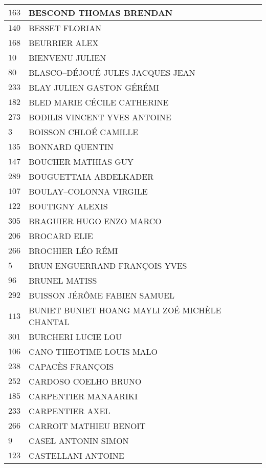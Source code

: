 \begin{xltabular}{\linewidth}{|l|X|}
    \hline
    $163$ & BESCOND THOMAS BRENDAN \\
    \hline
    $140$ & BESSET FLORIAN \\
    \hline
    $168$ & BEURRIER ALEX \\
    \hline
    $10$ & BIENVENU JULIEN \\
    \hline
    $80$ & BLASCO--DÉJOUÉ JULES JACQUES JEAN \\
    \hline
    $233$ & BLAY JULIEN GASTON GÉRÉMI \\
    \hline
    $182$ & BLED MARIE CÉCILE CATHERINE \\
    \hline
    $273$ & BODILIS VINCENT YVES ANTOINE \\
    \hline
    $3$ & BOISSON CHLOÉ CAMILLE \\
    \hline
    $135$ & BONNARD QUENTIN \\
    \hline
    $147$ & BOUCHER MATHIAS GUY \\
    \hline
    $289$ & BOUGUETTAIA ABDELKADER \\
    \hline
    $107$ & BOULAY--COLONNA VIRGILE \\
    \hline
    $122$ & BOUTIGNY ALEXIS \\
    \hline
    $305$ & BRAGUIER HUGO ENZO MARCO \\
    \hline
    $206$ & BROCARD ELIE \\
    \hline
    $266$ & BROCHIER LÉO RÉMI \\
    \hline
    $5$ & BRUN ENGUERRAND FRANÇOIS YVES \\
    \hline
    $96$ & BRUNEL MATISS \\
    \hline
    $292$ & BUISSON JÉRÔME FABIEN SAMUEL \\
    \hline
    $113$ & BUNIET BUNIET HOANG MAYLI ZOÉ MICHÈLE CHANTAL \\
    \hline
    $301$ & BURCHERI LUCIE LOU \\
    \hline
    $106$ & CANO THEOTIME LOUIS MALO \\
    \hline
    $238$ & CAPACÈS FRANÇOIS \\
    \hline
    $252$ & CARDOSO COELHO BRUNO \\
    \hline
    $185$ & CARPENTIER MANAARIKI \\
    \hline
    $233$ & CARPENTIER AXEL \\
    \hline
    $266$ & CARROIT MATHIEU BENOIT \\
    \hline
    $9$ & CASEL ANTONIN SIMON \\
    \hline
    $123$ & CASTELLANI ANTOINE \\

\end{xltabular}
